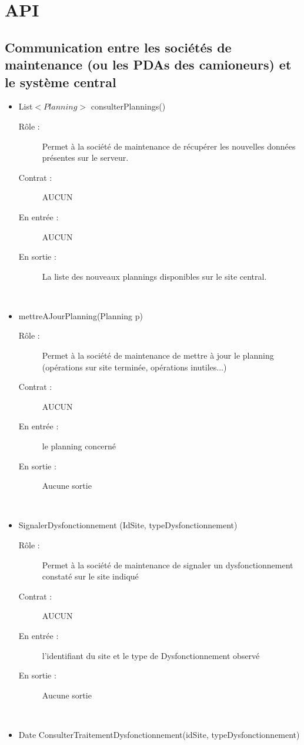 \section{API}

\subsection{Communication entre les sociétés de maintenance (ou les PDAs des camioneurs) et le système central}
\begin{itemize}
	\item List$<Planning>$ consulterPlannings()
	\begin{description} 
		\item[Rôle :] Permet à la société de maintenance de récupérer les nouvelles données présentes sur le serveur.
		\item[Contrat :] AUCUN
		\item[En entrée :] AUCUN
		\item[En sortie :] La liste des nouveaux plannings disponibles sur le site central.
	\end{description}
	~\\
	\item mettreAJourPlanning(Planning p)
	\begin{description} 
		\item[Rôle :] Permet à la société de maintenance de mettre à jour le planning (opérations sur site terminée, opérations inutiles...)
		\item[Contrat :] AUCUN
		\item[En entrée :] le planning concerné 
		\item[En sortie :] Aucune sortie
	\end{description}
	~\\
	\item SignalerDysfonctionnement (IdSite, typeDysfonctionnement)
	\begin{description} 
		\item[Rôle :] Permet à la société de maintenance de signaler un dysfonctionnement constaté sur le site indiqué
		\item[Contrat :] AUCUN
		\item[En entrée :] l'identifiant du site et le type de Dysfonctionnement observé
		\item[En sortie :] Aucune sortie
	\end{description}
	~\\
	\item Date ConsulterTraitementDysfonctionnement(idSite, typeDysfonctionnement)

\end{itemize}
